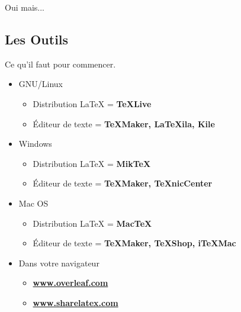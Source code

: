 \documentclass[10pt,svgnames,usenames,table]{beamer} %
\begin{document}
\begin{frame}{Oui mais...}
  \begin{center}
  \end{center}
\end{frame}

\subsection{Les Outils}
\begin{frame}{Ce qu'il faut pour commencer.}

  \begin{itemize}
	  \item GNU/Linux
	  \begin{itemize}
	  	\item Distribution \LaTeX{} = \textbf{TeXLive}
		\item Éditeur de texte = \textbf{TeXMaker, LaTeXila, Kile}
	  \end{itemize}
	  \item Windows
	  \begin{itemize}
	  	\item Distribution \LaTeX{} = \textbf{MikTeX}
		\item Éditeur de texte = \textbf{TeXMaker, TeXnicCenter}
	  \end{itemize}
	  \item Mac OS
	  \begin{itemize}
	  	\item Distribution \LaTeX{} = \textbf{MacTeX}
		\item Éditeur de texte = \textbf{TeXMaker, TeXShop, iTeXMac}
	  \end{itemize}
	  \item Dans votre navigateur
	  \begin{itemize}
		\item \textbf{\url{www.overleaf.com}}
  		\item \textbf{\url{www.sharelatex.com}}
	  \end{itemize}
  \end{itemize}
\end{frame}
\end{document}
